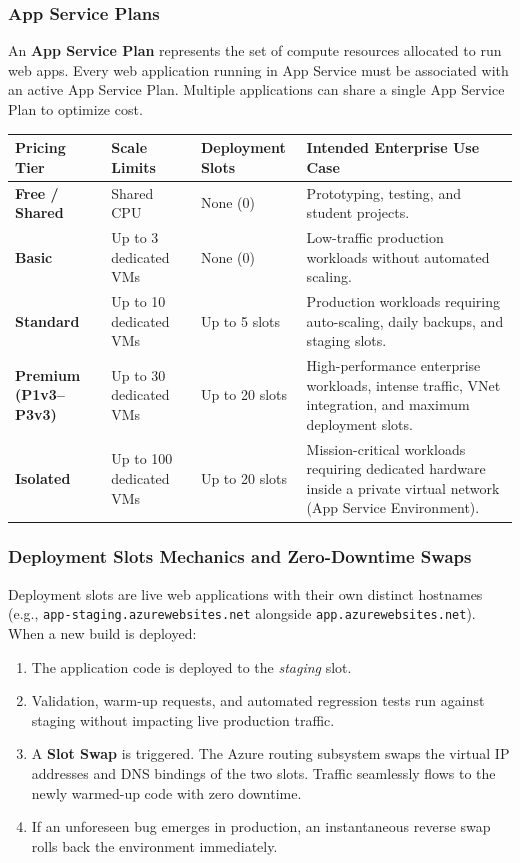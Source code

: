 \subsubsection{App Service Plans}
An \textbf{App Service Plan} represents the set of compute resources allocated to run web apps. Every web application running in App Service must be associated with an active App Service Plan. Multiple applications can share a single App Service Plan to optimize cost.
\begin{center}
\begin{tabularx}{\textwidth}{>{\bfseries}l p{2.2cm} p{2.5cm} X}
\toprule
Pricing Tier & Scale Limits & Deployment Slots & Intended Enterprise Use Case\\
\midrule
Free / Shared & Shared CPU & None (0) & Prototyping, testing, and student projects.\\
Basic & Up to 3 dedicated VMs & None (0) & Low-traffic production workloads without automated scaling.\\
Standard & Up to 10 dedicated VMs & Up to 5 slots & Production workloads requiring auto-scaling, daily backups, and staging slots.\\
Premium (P1v3--P3v3) & Up to 30 dedicated VMs & Up to 20 slots & High-performance enterprise workloads, intense traffic, VNet integration, and maximum deployment slots.\\
Isolated & Up to 100 dedicated VMs & Up to 20 slots & Mission-critical workloads requiring dedicated hardware inside a private virtual network (App Service Environment).\\
\bottomrule
\end{tabularx}
\end{center}

\subsubsection{Deployment Slots Mechanics and Zero-Downtime Swaps}
Deployment slots are live web applications with their own distinct hostnames (e.g., \texttt{app-staging.azurewebsites.net} alongside \texttt{app.azurewebsites.net}). When a new build is deployed:
\begin{enumerate}[leftmargin=*]
  \item The application code is deployed to the \emph{staging} slot.
  \item Validation, warm-up requests, and automated regression tests run against staging without impacting live production traffic.
  \item A \textbf{Slot Swap} is triggered. The Azure routing subsystem swaps the virtual IP addresses and DNS bindings of the two slots. Traffic seamlessly flows to the newly warmed-up code with zero downtime.
  \item If an unforeseen bug emerges in production, an instantaneous reverse swap rolls back the environment immediately.
\end{enumerate}

